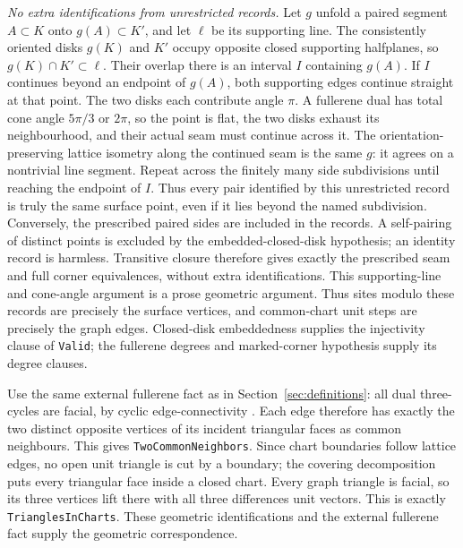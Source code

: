 \documentclass[11pt]{amsart}
\newcommand{\record}[1]{\nolinkurl{#1}}
\theoremstyle{definition}\newtheorem{definition}{Definition}
\begin{document}
\emph{No extra identifications from unrestricted records.}
Let $g$ unfold a paired segment $A\subset K$ onto $g(A)\subset K'$,
and let $\ell$ be its supporting line. The consistently oriented disks
$g(K)$ and $K'$ occupy opposite closed supporting halfplanes, so
$g(K)\cap K'\subset\ell$. Their overlap there is an interval $I$
containing $g(A)$. If $I$ continues beyond an endpoint of $g(A)$,
both supporting edges continue straight at that point. The two disks
each contribute angle $\pi$. A fullerene dual has total cone angle
$5\pi/3$ or $2\pi$, so the point is flat, the two disks exhaust its
neighbourhood, and their actual seam must continue across it. The
orientation-preserving lattice isometry along the continued seam is
the same $g$: it agrees on a nontrivial line segment. Repeat across
the finitely many side subdivisions until reaching the endpoint of
$I$. Thus every pair identified by this unrestricted record is truly
the same surface point, even if it lies beyond the named subdivision.
Conversely, the prescribed paired sides are included in the records.
A self-pairing of distinct points is excluded by the embedded-closed-disk
hypothesis; an identity record is harmless. Transitive closure therefore
gives exactly the prescribed seam and full corner equivalences, without
extra identifications. This supporting-line and cone-angle argument is
a prose geometric argument. Thus sites
modulo these records are precisely the surface vertices, and common-chart
unit steps are precisely the graph edges. Closed-disk embeddedness
supplies the injectivity clause of \record{Valid}; the fullerene degrees
and marked-corner hypothesis supply its degree clauses.

Use the same external fullerene fact as in Section~\ref{sec:definitions}:
all dual three-cycles are facial, by cyclic edge-connectivity
\cite{Connectivity}. Each edge therefore has exactly the two distinct
opposite vertices of its incident triangular faces as common neighbours.
This gives \record{TwoCommonNeighbors}. Since chart boundaries follow
lattice edges, no open unit triangle is cut by a boundary; the covering
decomposition puts every triangular face inside a closed chart.
Every graph triangle is facial, so its three vertices lift there with
all three differences unit vectors. This is exactly
\record{TrianglesInCharts}. These geometric identifications and the external fullerene fact
supply the geometric correspondence.
\end{document}
